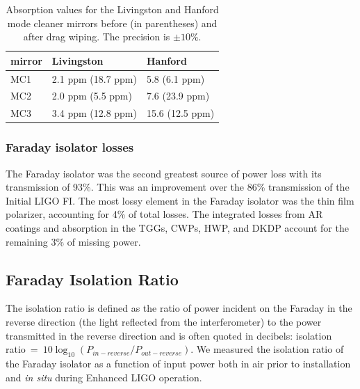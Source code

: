 \begin{table}
\centering
\caption[Absorption values for the Livingston and Hanford mode
cleaner mirrors]{Absorption values for the Livingston and Hanford mode
  cleaner mirrors before (in parentheses) and after drag wiping. The precision is $\pm 10\%$.} 
\begin{tabular}{l l l}
\hline
mirror & Livingston & Hanford\\
\hline
MC1 & 2.1 ppm (18.7 ppm) & 5.8 (6.1 ppm) \\
MC2 & 2.0 ppm (5.5 ppm) & 7.6 (23.9 ppm) \\
MC3 & 3.4 ppm (12.8 ppm) & 15.6 (12.5 ppm) \\
\hline
\end{tabular}
\label{tab:MCabsorption2}
\end{table}


\subsubsection{Faraday isolator losses} 
The Faraday isolator was the second greatest source of power loss with
its transmission of 93\%. This was an improvement over the
86\% transmission of the Initial LIGO FI. The most lossy element in the
Faraday isolator was the thin film polarizer, accounting for 4\% of
total losses. The integrated losses from AR coatings and absorption in the
TGGs, CWPs, HWP, and DKDP account for the remaining 3\% of missing power. 


\subsection{Faraday Isolation Ratio}
The isolation ratio is defined as the ratio of power incident on the
Faraday in the reverse direction (the light reflected from the
interferometer) to the power transmitted in the 
reverse direction and is often quoted in decibels: isolation ratio~=~$10
\log_{10}(P_{in-reverse}/P_{out-reverse})$.  We measured the isolation ratio of the
Faraday isolator as a function of input power both in air prior to
installation and \emph{in situ} during Enhanced LIGO operation.

